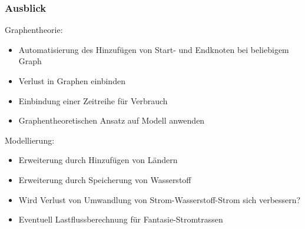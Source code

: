 \documentclass[aspectratio=169,t]{beamer}
\begin{document}
	
	\begin{frame}
		\frametitle{Ausblick}
		Graphentheorie:
		\begin{itemize} 
			\item Automatisierung des Hinzufügen von Start- und Endknoten bei beliebigem Graph
			\item Verlust in Graphen einbinden
			\item Einbindung einer Zeitreihe für Verbrauch
			\item Graphentheoretischen Ansatz auf Modell anwenden
			
		\end{itemize}
		Modellierung:
		\begin{itemize}
			\item Erweiterung durch Hinzufügen von Ländern
			\item Erweiterung durch Speicherung von Wasserstoff
			\item Wird Verlust von Umwandlung von Strom-Wasserstoff-Strom sich verbessern?
			\item Eventuell Lastflussberechnung für Fantasie-Stromtrassen
		\end{itemize}
	\end{frame}
	
	


	
	
	
	
	
	
\end{document}
